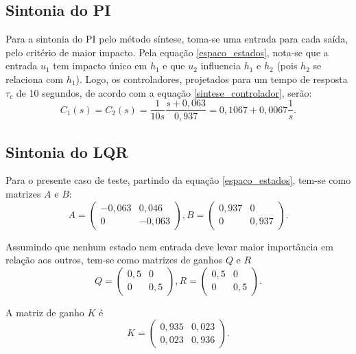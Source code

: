 \subsection{Sintonia do PI}

Para a sintonia do PI pelo método síntese, toma-se uma entrada para cada saída, pelo critério de maior impacto. Pela equação \eqref{espaco_estados}, nota-se que a entrada $u_1$ tem impacto único em $h_1$ e que $u_2$ influencia $h_1$ e $h_2$ (pois $h_2$ se relaciona com $h_1$). Logo, os controladores, projetados para um tempo de resposta $\tau_c$ de 10 segundos, de acordo com a equação \eqref{sintese_controlador}, serão:
\begin{equation}
C_1(s) = C_2(s) = \frac{1}{10s} \frac{s + 0,063}{0,937} = 0,1067 + 0,0067 \frac{1}{s}.
\end{equation}

\subsection{Sintonia do LQR}

Para o presente caso de teste, partindo da equação \eqref{espaco_estados}, tem-se como matrizes $A$ e $B$:
\begin{equation}
A = \begin{pmatrix} -0,063 & 0,046 \\ 0 & -0,063 \end{pmatrix},
B = \begin{pmatrix} 0,937 & 0 \\ 0 & 0,937 \end{pmatrix}.
\end{equation}

Assumindo que nenhum estado nem entrada deve levar maior importância em relação aos outros, tem-se como matrizes de ganhos $Q$ e $R$
\begin{equation}
Q = \begin{pmatrix} 0,5 & 0 \\ 0 & 0,5 \end{pmatrix},
R = \begin{pmatrix} 0,5 & 0 \\ 0 & 0,5 \end{pmatrix}.
\end{equation}

A matriz de ganho $K$ é
\begin{equation}
K = \begin{pmatrix} 0,935 & 0,023 \\ 0,023 & 0,936 \end{pmatrix}.
\end{equation}

